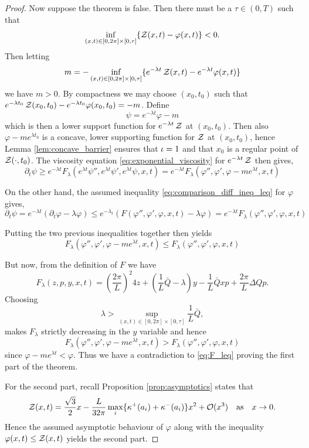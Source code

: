 \documentclass[12pt]{amsart}
\begin{document}
\begin{proof}
Now suppose the theorem is false. Then there must be a $\tau \in (0, T)$ such that
\[
\inf_{(x, t) \in [0, 2\pi] \times [0,\tau]} \{\operatorname{\mathcal{Z}}(x, t) - \varphi(x, t)\}  < 0.
\]
Then letting
\[
m = -\inf_{(x, t) \in [0, 2\pi] \times [0,\tau]} \{e^{-\lambda t} \operatorname{\mathcal{Z}}(x, t) - e^{-\lambda t} \varphi(x, t)\}
\]
we have $m > 0$. By compactness we may choose $(x_0, t_0)$ such that $e^{-\lambda t_0} \operatorname{\mathcal{Z}}(x_0, t_0) - e^{-\lambda t_0} \varphi(x_0, t_0) = -m$. Define
\[
\psi = e^{-\lambda t} \varphi - m
\]
which is then a lower support function for $e^{-\lambda t} \operatorname{\mathcal{Z}}$ at $(x_0, t_0)$. Then also $\varphi - m e^{\lambda t_0}$ is a concave, lower supporting function for $\operatorname{\mathcal{Z}}$ at $(x_0, t_0)$, hence Lemma \ref{lem:concave_barrier} ensures that $\operatorname{\iota} = 1$ and that $x_0$ is a regular point of $\operatorname{\mathcal{Z}}(\cdot, t_0)$. The viscosity equation \eqref{eq:exponential_viscosity} for $e^{-\lambda t}\operatorname{\mathcal{Z}}$ then gives,
\[
\partial_t \psi \geq e^{-\lambda t} F_{\lambda} (e^{\lambda t} \psi'', e^{\lambda t} \psi', e^{\lambda t} \psi, x, t) = e^{-\lambda t} F_{\lambda} (\varphi'', \varphi', \varphi - m e^{\lambda t}, x, t)
\]

On the other hand, the assumed inequality \eqref{eq:comparison_diff_ineq_leq} for $\varphi$ gives,
\[
\partial_t \psi = e^{-\lambda t} (\partial_t \varphi - \lambda \varphi) \leq e^{-\lambda_t}(F(\varphi'', \varphi', \varphi, x, t)  - \lambda \varphi) = e^{-\lambda t} F_{\lambda}(\varphi'', \varphi', \varphi, x, t)
\]

Putting the two previous inequalities together then yields
\begin{equation}
\label{eq:F_leq}
F_{\lambda} (\varphi'', \varphi', \varphi - m e^{\lambda t}, x, t) \leq F_{\lambda}(\varphi'', \varphi', \varphi, x, t)
\end{equation}

But now, from the definition of $F$ we have
\[
F_{\lambda} (z, p, y, x, t) = \left(\frac{2\pi}{L}\right)^2 4 z + (\frac{1}{L} \bar{Q} - \lambda) y - \frac{1}{L} \bar{Q} x p + \frac{2\pi}{L} \Delta Q p.
\]
Choosing
\[
\lambda > \sup_{(x, t) \in [0, 2\pi] \times [0, \tau]} \frac{1}{L} \bar{Q},
\]
makes $F_{\lambda}$ strictly decreasing in the $y$ variable and hence
\[
F_{\lambda} (\varphi'', \varphi', \varphi - m e^{\lambda t}, x, t) > F_{\lambda}(\varphi'', \varphi', \varphi, x, t)
\]
since $\varphi - m e^{\lambda t} < \varphi$. Thus we have a contradiction to \eqref{eq:F_leq} proving the first part of the theorem.

For the second part, recall Proposition \ref{prop:asymptotics} states that
\[
\operatorname{\mathcal{Z}}(x, t) = \frac{\sqrt{3}}{2}x - \frac{L}{32\pi} \max_i \{\operatorname{\kappa}^+(a_i) + \operatorname{\kappa}^-(a_i)\} x^2 + \operatorname{\mathcal{O}}(x^3) \quad \text{as} \quad x \to 0.
\]
Hence the assumed asymptotic behaviour of $\varphi$ along with the inequality $\varphi(x, t) \leq \operatorname{\mathcal{Z}}(x, t)$ yields the second part.
\end{proof}
\end{document}
